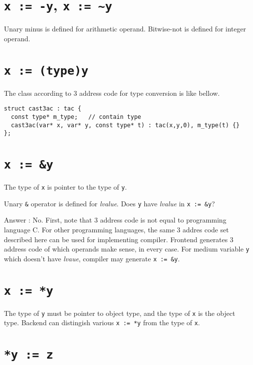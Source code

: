 \section{{\tt{x := -y}}, {\tt{x := \~{}y}}}

Unary minus is defined for arithmetic operand.
Bitwise-not is defined for integer operand.

\section{{\tt{x := (type)y}}}

The class according to 3 address code for type conversion is like
bellow.
\begin{verbatim}
struct cast3ac : tac {
  const type* m_type;   // contain type
  cast3ac(var* x, var* y, const type* t) : tac(x,y,0), m_type(t) {}
};  
\end{verbatim}

\section{{\tt{x := \&y}}}

The type of {\tt{x}} is pointer to the type of {\tt{y}}.

\begin{QandA}
Unary {\tt{\&}} operator is defined for {\it lvalue}.
Does {\tt {y}} have {\it lvalue} in {\tt{x := \&y}}?

Answer : No. First, note that 3 address code is not
equal to programming language C. For other programming
languages, the same 3 addres code set described here
can be used for implementing compiler. Frontend generates
3 address code of which operands make sense, in every case.
For medium variable {\tt{y}} which doesn't have {\it lvaue},
compiler may generate {\tt{x := \&y}}.
\end{QandA}

\section{{\tt{x := *y}}}

The type of {\tt{y}} must be pointer to object type,
and the type of {\tt{x}} is the object type.
Backend can distingish various {\tt{x := *y}} from the type of {\tt{x}}.

\section{{\tt{*y := z}}}

